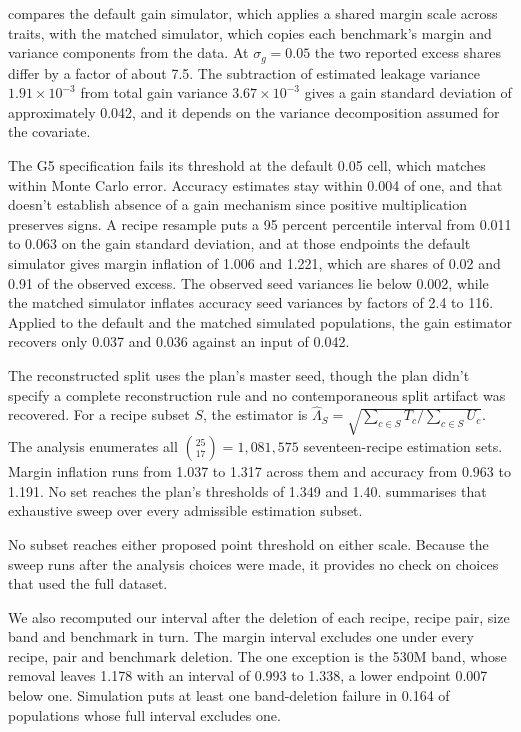 
 compares the default gain simulator, which applies a shared margin scale across traits, with the matched simulator, which copies each benchmark's margin and variance components from the data. At $\sigma_g=0.05$ the two reported excess shares differ by a factor of about 7.5. The subtraction of estimated leakage variance $1.91\times10^{-3}$ from total gain variance $3.67\times10^{-3}$ gives a gain standard deviation of approximately 0.042, and it depends on the variance decomposition assumed for the covariate.

The G5 specification fails its threshold at the default 0.05 cell, which matches  within Monte Carlo error. Accuracy estimates stay within 0.004 of one, and that doesn't establish absence of a gain mechanism since positive multiplication preserves signs. A recipe resample puts a 95 percent percentile interval from 0.011 to 0.063 on the gain standard deviation, and at those endpoints the default simulator gives margin inflation of 1.006 and 1.221, which are shares of 0.02 and 0.91 of the observed excess. The observed seed variances lie below 0.002, while the matched simulator inflates accuracy seed variances by factors of 2.4 to 116. Applied to the default and the matched simulated populations, the gain estimator recovers only 0.037 and 0.036 against an input of 0.042.

The reconstructed split uses the plan's master seed, though the plan didn't specify a complete reconstruction rule and no contemporaneous split artifact was recovered. For a recipe subset $S$, the estimator is $\widehat\Lambda_S=\sqrt{\sum_{c\in S}T_c/\sum_{c\in S}U_c}$. The analysis enumerates all $\binom{25}{17}=1{,}081{,}575$ seventeen-recipe estimation sets. Margin inflation runs from 1.037 to 1.317 across them and accuracy from 0.963 to 1.191. No set reaches the plan's thresholds of 1.349 and 1.40.  summarises that exhaustive sweep over every admissible estimation subset.

No subset reaches either proposed point threshold on either scale. Because the sweep runs after the analysis choices were made, it provides no check on choices that used the full dataset.

We also recomputed our interval after the deletion of each recipe, recipe pair, size band and benchmark in turn. The margin interval excludes one under every recipe, pair and benchmark deletion. The one exception is the 530M band, whose removal leaves 1.178 with an interval of 0.993 to 1.338, a lower endpoint 0.007 below one. Simulation puts at least one band-deletion failure in 0.164 of populations whose full interval excludes one.

